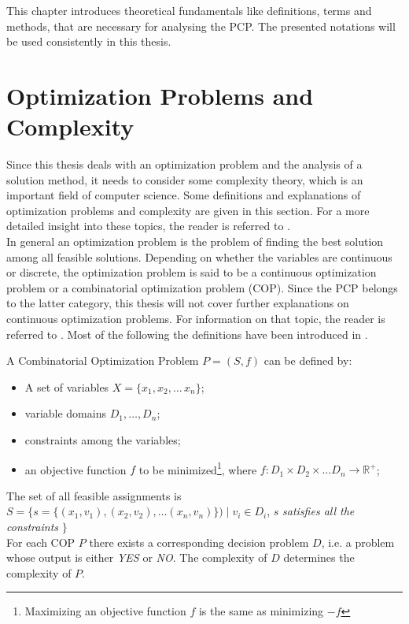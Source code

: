 \cite{dipl}
This chapter introduces theoretical fundamentals like definitions, terms and methods, that are necessary for analysing the PCP. The presented notations will be used consistently in this thesis. 
\section{Optimization Problems and Complexity}
Since this thesis deals with an optimization problem and the analysis of a solution method, it needs to consider some complexity theory, which is an important field of computer science. Some definitions and explanations of optimization problems and complexity are given in this section.
For a more detailed insight into these topics, the reader is referred to \cite{lawler-01,papadimitriou-94,garey-79}.\\
In general an optimization problem is the problem of finding the best solution among all feasible solutions. Depending on whether the variables are continuous or discrete, the optimization problem is said to be a continuous optimization problem or a combinatorial optimization problem (COP). Since the PCP belongs to the latter category, this thesis will not cover further explanations on continuous optimization problems. For information on that topic, the reader is referred to \cite{nocedal-00, pardalos-02}. Most of the following the definitions have been introduced in \cite{blum-05, neumann-10}.
\begin{definition}
A Combinatorial Optimization Problem $P = (S, f)$ can be defined by: 
\begin{itemize}
\item A set of variables $X=\{x_1,x_2,\ldots \,x_n\}$;
\item variable domains $D_1,\ldots , D_n$;
\item constraints among the variables;
\item an objective function $f$ to be minimized\footnote[1]{Maximizing an objective function $f$ is the same as minimizing $- f$}, where $f : D_1 \times D_2 \times \ldots D_n \rightarrow \mathbb{R}^+$;
\end{itemize}
\end{definition}
The set of all feasible assignments is $S = \{s=\{(x_1,v_1),(x_2,v_2),\ldots (x_n,v_n)\}) \mid v_i \in D_i$, $s$ \textit{satisfies all the constraints} $\}$\\
For each COP $P$ there exists a corresponding decision problem $D$, i.e. a problem whose output is either \textit{YES} or \textit{NO}. The complexity of $D$ determines the complexity of $P$.
